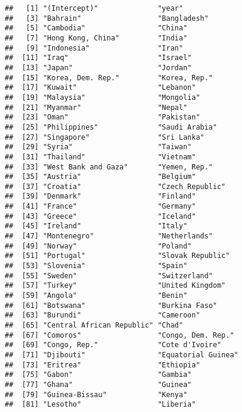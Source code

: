 \documentclass[
]{book}
\begin{document}
\begin{verbatim}
##   [1] "(Intercept)"              "year"                    
##   [3] "Bahrain"                  "Bangladesh"              
##   [5] "Cambodia"                 "China"                   
##   [7] "Hong Kong, China"         "India"                   
##   [9] "Indonesia"                "Iran"                    
##  [11] "Iraq"                     "Israel"                  
##  [13] "Japan"                    "Jordan"                  
##  [15] "Korea, Dem. Rep."         "Korea, Rep."             
##  [17] "Kuwait"                   "Lebanon"                 
##  [19] "Malaysia"                 "Mongolia"                
##  [21] "Myanmar"                  "Nepal"                   
##  [23] "Oman"                     "Pakistan"                
##  [25] "Philippines"              "Saudi Arabia"            
##  [27] "Singapore"                "Sri Lanka"               
##  [29] "Syria"                    "Taiwan"                  
##  [31] "Thailand"                 "Vietnam"                 
##  [33] "West Bank and Gaza"       "Yemen, Rep."             
##  [35] "Austria"                  "Belgium"                 
##  [37] "Croatia"                  "Czech Republic"          
##  [39] "Denmark"                  "Finland"                 
##  [41] "France"                   "Germany"                 
##  [43] "Greece"                   "Iceland"                 
##  [45] "Ireland"                  "Italy"                   
##  [47] "Montenegro"               "Netherlands"             
##  [49] "Norway"                   "Poland"                  
##  [51] "Portugal"                 "Slovak Republic"         
##  [53] "Slovenia"                 "Spain"                   
##  [55] "Sweden"                   "Switzerland"             
##  [57] "Turkey"                   "United Kingdom"          
##  [59] "Angola"                   "Benin"                   
##  [61] "Botswana"                 "Burkina Faso"            
##  [63] "Burundi"                  "Cameroon"                
##  [65] "Central African Republic" "Chad"                    
##  [67] "Comoros"                  "Congo, Dem. Rep."        
##  [69] "Congo, Rep."              "Cote d'Ivoire"           
##  [71] "Djibouti"                 "Equatorial Guinea"       
##  [73] "Eritrea"                  "Ethiopia"                
##  [75] "Gabon"                    "Gambia"                  
##  [77] "Ghana"                    "Guinea"                  
##  [79] "Guinea-Bissau"            "Kenya"                   
##  [81] "Lesotho"                  "Liberia"                 

\end{verbatim}
\end{document}

